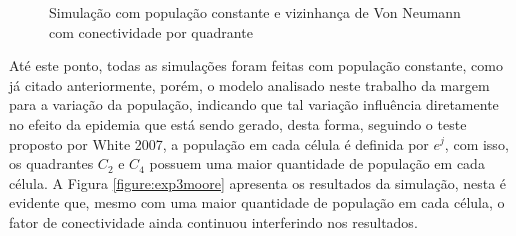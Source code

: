 \documentclass[a4paper,12pt]{article}
\begin{document}
\begin{figure}[!ht]
\qquad
{}
\qquad
{}
\caption{Simulação com população constante e vizinhança de Von Neumann com conectividade por quadrante}
\label{figure:exp2vonneumann}
\end{figure}

Até este ponto, todas as simulações foram feitas com população constante, como já citado anteriormente, porém, o modelo analisado neste trabalho da margem para a variação da população, indicando que tal variação influência diretamente no efeito da epidemia que está sendo gerado, desta forma, seguindo o teste proposto por White 2007\cite{White2007}, a população em cada célula é definida por $e^j$, com isso, os quadrantes $C_2$ e $C_4$ possuem uma maior quantidade de população em cada célula. A Figura \ref{figure:exp3moore} apresenta os resultados da simulação, nesta é evidente que, mesmo com uma maior quantidade de população em cada célula, o fator de conectividade ainda continuou interferindo nos resultados. 
\end{document}
